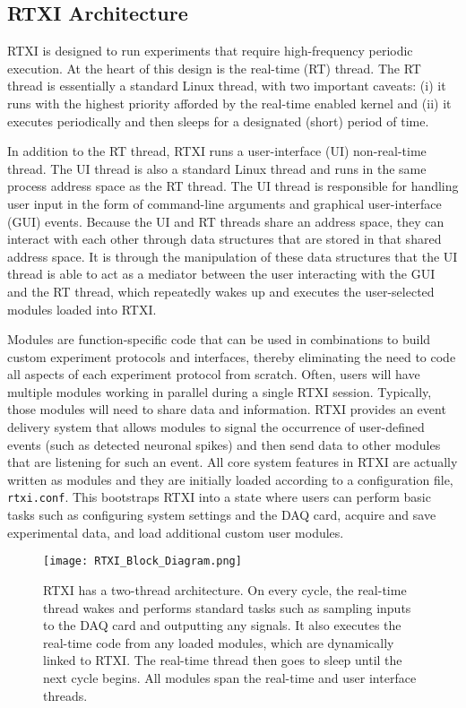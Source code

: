 \subsection{RTXI Architecture}

RTXI is designed to run experiments that require high-frequency periodic execution. At the heart of this design is the real-time (RT) thread. The RT thread is essentially a standard Linux thread, with two important caveats: (i) it runs with the highest priority afforded by the real-time enabled kernel and (ii) it executes periodically and then sleeps for a designated (short) period of time.

In addition to the RT thread, RTXI runs a user-interface (UI) non-real-time thread. The UI thread is also a standard Linux thread and runs in the same process address space as the RT thread. The UI thread is responsible for handling user input in the form of command-line arguments and graphical user-interface (GUI) events. Because the UI and RT threads share an address space, they can interact with each other through data structures that are stored in that shared address space. It is through the manipulation of these data structures that the UI thread is able to act as a mediator between the user interacting with the GUI and the RT thread, which repeatedly wakes up and executes the user-selected modules loaded into RTXI. 

Modules are function-specific code that can be used in combinations to build custom experiment protocols and interfaces, thereby eliminating the need to code all aspects of each experiment protocol from scratch. Often, users will have multiple modules working in parallel during a single RTXI session. Typically, those modules will need to share data and information. RTXI provides an event delivery system that allows modules to signal the occurrence of user-defined events (such as detected neuronal spikes) and then send data to other modules that are listening for such an event. All core system features in RTXI are actually written as modules and they are initially loaded according to a configuration file, \texttt{rtxi.conf}. This bootstraps RTXI into a state where users can perform basic tasks such as configuring system settings and the DAQ card, acquire and save experimental data, and load additional custom user modules.

\begin{figure}[h]
\begin{maxipage}
\begin{center}
\texttt{[image: RTXI\_Block\_Diagram.png]} 
\caption[RTXI Architecture]{RTXI has a two-thread architecture. On every cycle, the real-time thread wakes and performs standard tasks such as sampling inputs to the DAQ card and outputting any signals. It also executes the real-time code from any loaded modules, which are dynamically linked to RTXI. The real-time thread then goes to sleep until the next cycle begins. All modules span the real-time and user interface threads.} 
\end{center}
\end{maxipage}
\end{figure}

